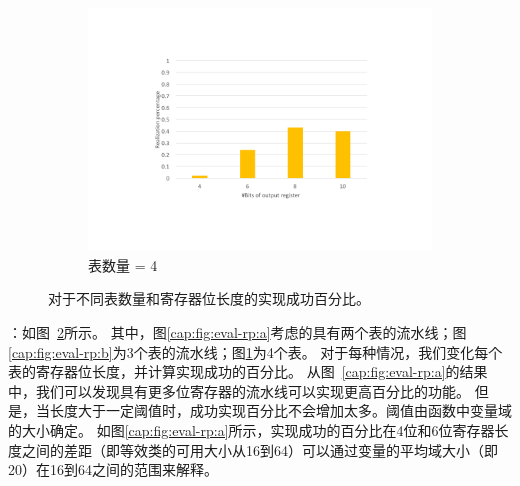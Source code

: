 \begin{figure}
  \vspace{0.5cm}
  \begin{subfigure}[b]{0.46\textwidth}
      \includegraphics[width=\textwidth]{figures/figure-eval-rp-4.pdf}
      \caption{表数量 = 4}
      \label{cap:fig:eval-rp:c}
  \end{subfigure}
  \caption{对于不同表数量和寄存器位长度的实现成功百分比。}
  \label{cap:fig:eval-rp} %
\end{figure}

：如图~\ref{cap:fig:eval-rp}所示。
其中，图\ref{cap:fig:eval-rp:a}考虑的具有两个表的流水线；图\ref{cap:fig:eval-rp:b}为3个表的流水线；图\ref{cap:fig:eval-rp:c}为4个表。
对于每种情况，我们变化每个表的寄存器位长度，并计算实现成功的百分比。
从图~\ref{cap:fig:eval-rp:a}的结果中，我们可以发现具有更多位寄存器的流水线可以实现更高百分比的功能。
但是，当长度大于一定阈值时，成功实现百分比不会增加太多。阈值由函数中变量域的大小确定。
如图\ref{cap:fig:eval-rp:a}所示，实现成功的百分比在4位和6位寄存器长度之间的差距（即等效类的可用大小从16到64）可以通过变量的平均域大小（即20）在16到64之间的范围来解释。




